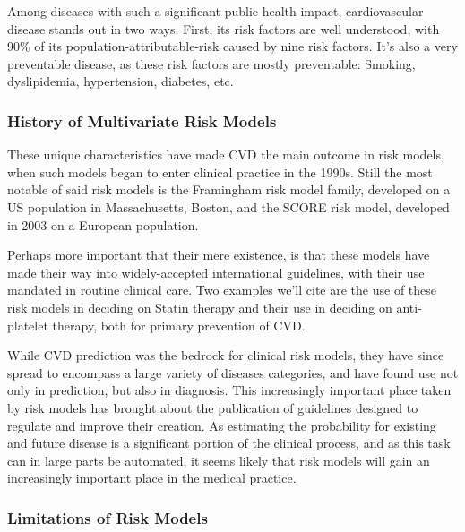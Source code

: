 \documentclass[a4paper,12pt]{article}
\begin{document}
			Among diseases with such a significant public health impact, cardiovascular disease stands out in two ways. First, its risk factors are well understood, with 90\% of its population-attributable-risk caused by nine risk factors. It's also a very preventable disease, as these risk factors are mostly preventable\cite{Yusuf2004,ODonnell2016}: Smoking, dyslipidemia, hypertension, diabetes, etc.
			
			\subsubsection{History of Multivariate Risk Models}
		
			These unique characteristics have made CVD the main outcome in risk models, when such models began to enter clinical practice in the 1990s\cite{Wilson1998,NationalCholesterolEducationProgramNCEPExpertPanelonDetection2002,Conroy2003,Hippisley-Cox2007,DAgostino2008,Hippisley-Cox2008,Goff2014}. Still the most notable of said risk models is the Framingham risk model family, developed on a US population in Massachusetts, Boston\cite{Wilson1998}, and the SCORE risk model, developed in 2003 on a European population\cite{Conroy2003}.
			
			Perhaps more important that their mere existence, is that these models have made their way into widely-accepted international guidelines, with their use mandated in routine clinical care. Two examples we'll cite are the use of these risk models in deciding on Statin therapy\cite{Goff2014} and their use in deciding on anti-platelet therapy\cite{Bibbins-Domingo2016}, both for primary prevention of CVD.
			
			While CVD prediction was the bedrock for clinical risk models, they have since spread to encompass a large variety of diseases categories\cite{Kanis2008,Kansagara2011}, and have found use not only in prediction, but also in diagnosis\cite{Usher-Smith2016}. This increasingly important place taken by risk models has brought about the publication of guidelines designed to regulate and improve their creation\cite{Collins2015}. As estimating the probability for existing and future disease is a significant portion of the clinical process\cite{Moons2009}, and as this task can in large parts be automated, it seems likely that risk models will gain an increasingly important place in the medical practice.
			
			\subsubsection{Limitations of Risk Models}
		
\end{document}
